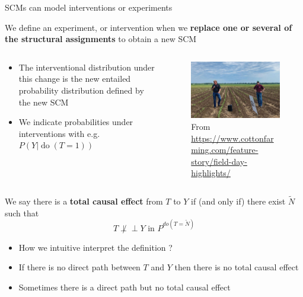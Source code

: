 \documentclass{beamer}
\newcommand{\indep}{\perp \!\!\! \perp}
\begin{document}
\begin{frame}{SCMs can model interventions or experiments}
\begin{block}{}
  We define an experiment, or intervention when
  we \textbf{replace one or several of the structural assignments}
to obtain a new SCM
    \end{block}
  \begin{columns}
\begin{column}{0.5\textwidth}
    \begin{itemize}
      \item<2-> The interventional distribution under this change is the new
entailed probability distribution defined by the new SCM 
      \item<3-> We indicate probabilities under interventions with e.g.  
	         $P( Y | \operatorname{do}(T = 1))$  
    \end{itemize}
\end{column}
\begin{column}{0.5\textwidth}
  \begin{figure}
  \includegraphics[width=\textwidth]{cotton-exp}
    \caption{From \url{https://www.cottonfarming.com/feature-story/field-day-highlights/}}
  \end{figure}
\end{column}
  \end{columns}
\end{frame}

\begin{frame}
  \begin{definition} 
We say there is a \textbf{total causal effect} from $T$ to $Y$  if (and only if)
		 there exist $\tilde{N}$ such that 
			\[ T \not \indep Y \text{ in } P^{do(T = \tilde{N})}  \]
  \end{definition}

  \begin{itemize}[<+-|alert@+>]
    \item How we intuitive interpret the definition ?   
    \item If there is no direct path between $T$ and $Y$ then there is no total causal effect 
    \item Sometimes there is a direct path but no total causal effect 
  \end{itemize}
\end{frame}
\end{document}
